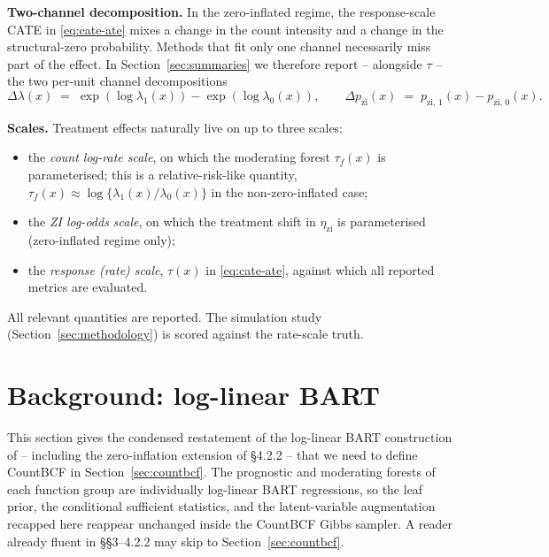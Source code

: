 \documentclass[11pt]{article}
\theoremstyle{plain}
\theoremstyle{definition}
\theoremstyle{remark}
\newcommand{\tauF}{\tau_f}
\newcommand{\tauresp}{\tau}                 %
\newcommand{\pzi}[1][z]{p_{\mathrm{zi},\,#1}}
\newcommand{\etazi}{\eta_{\mathrm{zi}}}
\newcommand{\Deltalam}{\Delta\lambda}
\newcommand{\Deltapzi}{\Delta p_{\mathrm{zi}}}
\begin{document}
\medskip
\noindent\textbf{Two-channel decomposition.}
In the zero-inflated regime, the response-scale CATE in
\eqref{eq:cate-ate} mixes a change in the count intensity and a
change in the structural-zero probability. Methods that fit only one
channel necessarily miss part of the effect. In
Section~\ref{sec:summaries} we therefore report -- alongside
$\tauresp$ -- the two per-unit channel decompositions
\begin{equation}
  \Deltalam(x) \;=\; \exp(\log \lambda_1(x)) - \exp(\log \lambda_0(x)),
  \qquad
  \Deltapzi(x) \;=\; \pzi[1](x) - \pzi[0](x).
  \label{eq:channels}
\end{equation}

\medskip
\noindent\textbf{Scales.}
Treatment effects naturally live on up to three scales:
\begin{itemize}
  \item the \emph{count log-rate scale}, on which the moderating forest
        $\tauF(x)$ is parameterised; this is a relative-risk-like
        quantity, $\tauF(x) \approx \log\{\lambda_1(x) / \lambda_0(x)\}$
        in the non-zero-inflated case;
  \item the \emph{ZI log-odds scale}, on which the treatment shift in
        $\etazi$ is parameterised (zero-inflated regime only);
  \item the \emph{response (rate) scale}, $\tauresp(x)$ in
        \eqref{eq:cate-ate}, against which all reported metrics are
        evaluated.
\end{itemize}
All relevant quantities are reported. The simulation study
(Section~\ref{sec:methodology}) is scored against the rate-scale
truth.

\section{Background: log-linear BART}\label{sec:background}

This section gives the condensed restatement of the log-linear BART
construction of \citet{murray2021loglinear} -- including the
zero-inflation extension of \S4.2.2 -- that we need to define
CountBCF in Section~\ref{sec:countbcf}. The prognostic and moderating
forests of each function group are individually log-linear BART
regressions, so the leaf prior, the conditional sufficient
statistics, and the latent-variable augmentation recapped here
reappear unchanged inside the CountBCF Gibbs sampler. A reader
already fluent in \citet{murray2021loglinear} \S\S3--4.2.2 may skip to
Section~\ref{sec:countbcf}.
\end{document}
